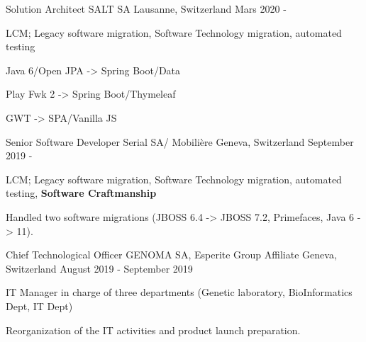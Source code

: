 

\begin{cventries}
        
        \cventry
        {Solution Architect} %
        {SALT SA} %
        {Lausanne, Switzerland} %
        {Mars 2020 - } %
        {
            \begin{cvitems} %
                \item{LCM; Legacy software migration, Software Technology migration, automated testing}
                \item{Java 6/Open JPA -> Spring Boot/Data}
                \item{Play Fwk 2 -> Spring Boot/Thymeleaf}
                \item{GWT -> SPA/Vanilla JS}
            \end{cvitems}
        }

        \cventry
        {Senior Software Developer} %
        {Serial SA/ Mobilière} %
        {Geneva, Switzerland} %
        {September 2019 - } %
        {
            \begin{cvitems} %
                \item{LCM; Legacy software migration, Software Technology migration, automated testing, \textbf{Software Craftmanship}}
                \item{Handled two software migrations (JBOSS 6.4 -> JBOSS 7.2, Primefaces, Java 6 -> 11).}
            \end{cvitems}
        }

        \cventry
        {Chief Technological Officer} %
        {GENOMA SA, Esperite Group Affiliate} %
        {Geneva, Switzerland} %
        {August 2019 - September 2019 } %
        {
            \begin{cvitems} %
                \item{IT Manager in charge of three departments (Genetic laboratory, BioInformatics Dept, IT Dept)}
                \item{Reorganization of the IT activities and product launch preparation.}
            \end{cvitems}
        }


\end{cventries}
